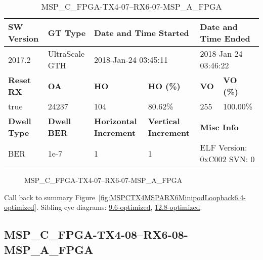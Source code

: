 \begin{table}[h]
\centering
\caption{MSP\_C\_FPGA-TX4-07--RX6-07-MSP\_A\_FPGA}
\label{tab:MSPCFPGATX407RX607MSPAFPGA6.4-optimized}
\begin{tabular}{@{}|l|l|l|l|l|l|@{}}
\toprule
\textbf{SW Version}                & \textbf{GT Type}   & \multicolumn{2}{l|}{\textbf{Date and Time Started}}            & \multicolumn{2}{l|}{\textbf{Date and Time Ended}}        \\ \midrule
2017.2                       & UltraScale GTH          & \multicolumn{2}{l|}{2018-Jan-24 03:45:11}                   & \multicolumn{2}{l|}{2018-Jan-24 03:46:22}               \\ \midrule
\textbf{Reset RX}                  & \textbf{OA} & \textbf{HO}   & \textbf{HO (\%)} & \textbf{VO} & \textbf{VO (\%)} \\ \midrule
true & 24237        & 104          & 80.62\%        & 255        & 100.00\%       \\ \midrule
\textbf{Dwell Type}                & \textbf{Dwell BER} & \textbf{Horizontal Increment} & \textbf{Vertical Increment}    & \multicolumn{2}{l|}{\textbf{Misc Info}}                  \\ \midrule
BER                            & 1e-7        & 1        & 1           & \multicolumn{2}{l|}{ELF Version: 0xC002 SVN: 0}                         \\ \bottomrule
\end{tabular}
\end{table}

\begin{figure}[h]
\caption{MSP\_C\_FPGA-TX4-07--RX6-07-MSP\_A\_FPGA} \label{fig:MSPCFPGATX407RX607MSPAFPGA6.4-optimized}
\end{figure}

Call back to summary Figure~\ref{fig:MSPCTX4MSPARX6MinipodLoopback6.4-optimized}.
Sibling eye diagrams: \hyperref[sec:MSPCFPGATX407RX607MSPAFPGA9.6-optimized]{9.6-optimized}, \hyperref[sec:MSPCFPGATX407RX607MSPAFPGA12.8-optimized]{12.8-optimized}.

\clearpage
\newpage


\subsection{MSP\_C\_FPGA-TX4-08--RX6-08-MSP\_A\_FPGA}\label{sec:MSPCFPGATX408RX608MSPAFPGA6.4-optimized}

